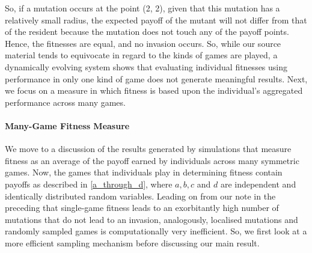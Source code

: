\documentclass[11pt]{book}
\newcommand*{\np}{\par\noindent\newline}
\begin{document}
\np So, if a mutation occurs at the point (2, 2), given that this mutation has a relatively small radius, 
the expected payoff of the mutant will not differ from that of the resident because the mutation does not touch any of the payoff points.
Hence, the fitnesses are equal, and no invasion occurs. 
So, while our source material tends to equivocate in regard to the kinds of games are played, 
a dynamically evolving system shows that evaluating individual fitnesses using performance in only one kind of game does not generate meaningful results.
Next, we focus on a  measure in which fitness is based upon the individual's aggregated performance across many games.

\paragraph{Many-Game Fitness Measure}
\np We move to a discussion of the results generated by simulations that measure fitness as an average of the payoff earned by individuals across many symmetric games.
Now, the games that individuals play in determining fitness contain payoffs as described in \ref{a_through_d}, where $a, b, c$ and $d$ are independent and identically distributed random variables.
Leading on from our note in the preceding that single-game fitness leads to an exorbitantly high number of mutations that do not lead to an invasion, analogously, 
localised mutations and randomly sampled games is computationally very inefficient. So, we first look at a more efficient sampling mechanism before discussing our main result.
\end{document}
